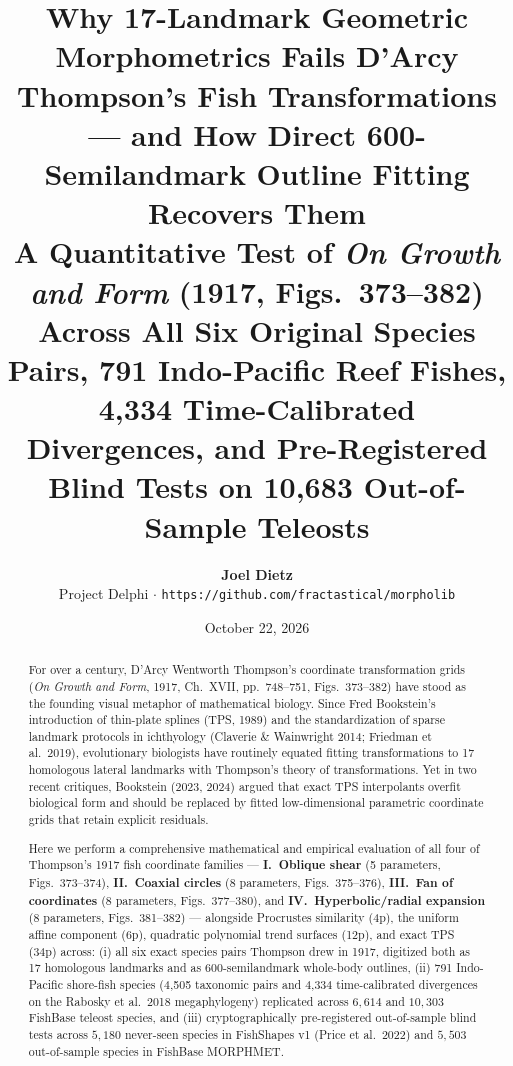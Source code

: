 \documentclass[11pt,a4paper]{article}
\title{\textbf{Why 17-Landmark Geometric Morphometrics Fails D'Arcy Thompson's Fish Transformations --- and How Direct 600-Semilandmark Outline Fitting Recovers Them}\\[0.5em]
\large A Quantitative Test of \emph{On Growth and Form} (1917, Figs.\ 373--382) Across All Six Original Species Pairs, 791 Indo-Pacific Reef Fishes, 4,334 Time-Calibrated Divergences, and Pre-Registered Blind Tests on 10,683 Out-of-Sample Teleosts}
\author{
  \textbf{Joel Dietz}\\
  Project Delphi $\cdot$ \texttt{https://github.com/fractastical/morpholib}
}
\date{October 22, 2026}
\theoremstyle{definition}
\theoremstyle{remark}
\begin{document}
\maketitle

\begin{abstract}
For over a century, D'Arcy Wentworth Thompson's coordinate transformation grids (\emph{On Growth and Form}, 1917, Ch.\ XVII, pp.\ 748--751, Figs.\ 373--382) have stood as the founding visual metaphor of mathematical biology. Since Fred Bookstein's introduction of thin-plate splines (TPS, 1989) and the standardization of sparse landmark protocols in ichthyology (Claverie \& Wainwright 2014; Friedman et al.\ 2019), evolutionary biologists have routinely equated fitting transformations to 17 homologous lateral landmarks with Thompson's theory of transformations. Yet in two recent critiques, Bookstein (2023, 2024) argued that exact TPS interpolants overfit biological form and should be replaced by fitted low-dimensional parametric coordinate grids that retain explicit residuals.

Here we perform a comprehensive mathematical and empirical evaluation of all four of Thompson's 1917 fish coordinate families --- \textbf{I.\ Oblique shear} (5 parameters, Figs.\ 373--374), \textbf{II.\ Coaxial circles} (8 parameters, Figs.\ 375--376), \textbf{III.\ Fan of coordinates} (8 parameters, Figs.\ 377--380), and \textbf{IV.\ Hyperbolic/radial expansion} (8 parameters, Figs.\ 381--382) --- alongside Procrustes similarity (4p), the uniform affine component (6p), quadratic polynomial trend surfaces (12p), and exact TPS (34p) across: (i) all six exact species pairs Thompson drew in 1917, digitized both as 17 homologous landmarks and as 600-semilandmark whole-body outlines, (ii) 791 Indo-Pacific shore-fish species (4,505 taxonomic pairs and 4,334 time-calibrated divergences on the Rabosky et al.\ 2018 megaphylogeny) replicated across $6{,}614$ and $10{,}303$ FishBase teleost species, and (iii) cryptographically pre-registered out-of-sample blind tests across $5{,}180$ never-seen species in FishShapes v1 (Price et al.\ 2022) and $5{,}503$ out-of-sample species in FishBase MORPHMET.


\end{abstract}
\end{document}
